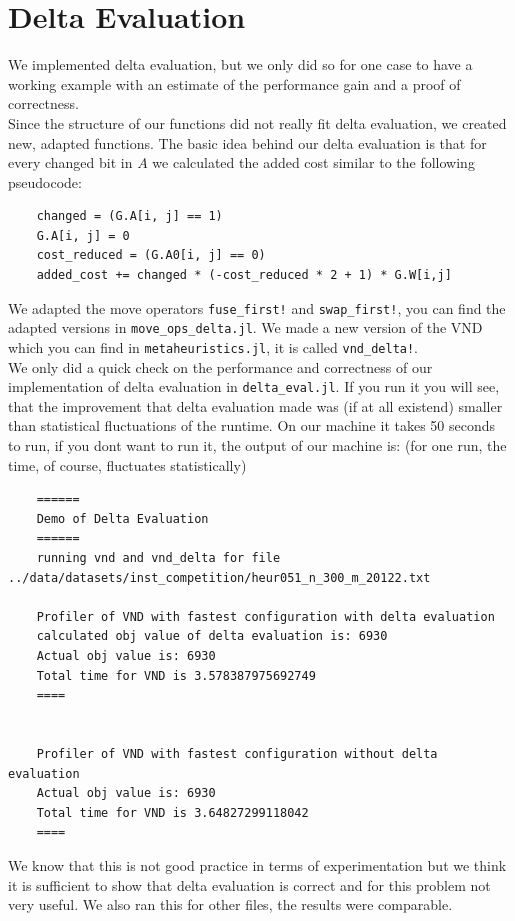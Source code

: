 \section{Delta Evaluation}

We implemented delta evaluation, but we only did so for one case to have a working example with an estimate of the performance gain and a proof of correctness.\\
Since the structure of our functions did not really fit delta evaluation, we created new, adapted functions. The basic idea behind our delta evaluation is that for every changed bit in $A$ we calculated the added cost similar to the following pseudocode:\\
\begin{verbatim}
    changed = (G.A[i, j] == 1)
    G.A[i, j] = 0
    cost_reduced = (G.A0[i, j] == 0)
    added_cost += changed * (-cost_reduced * 2 + 1) * G.W[i,j]
\end{verbatim}
We adapted the move operators \texttt{fuse\_first!} and \texttt{swap\_first!}, you can find the adapted versions in \texttt{move\_ops\_delta.jl}. We made a new version of the VND which you can find in \texttt{metaheuristics.jl}, it is called \texttt{vnd\_delta!}.\\
We only did a quick check on the performance and correctness of our implementation of delta evaluation in \texttt{delta\_eval.jl}. If you run it you will see, that the improvement that delta evaluation made was (if at all existend) smaller than statistical fluctuations of the runtime. On our machine it takes 50 seconds to run, if you dont want to run it, the output of our machine is: (for one run, the time, of course, fluctuates statistically)
\begin{verbatim}
    ======
    Demo of Delta Evaluation
    ======
    running vnd and vnd_delta for file ../data/datasets/inst_competition/heur051_n_300_m_20122.txt
    
    Profiler of VND with fastest configuration with delta evaluation
    calculated obj value of delta evaluation is: 6930
    Actual obj value is: 6930
    Total time for VND is 3.578387975692749
    ====
    
    
    Profiler of VND with fastest configuration without delta evaluation
    Actual obj value is: 6930
    Total time for VND is 3.64827299118042
    ====
\end{verbatim}
We know that this is not good practice in terms of experimentation but we think it is sufficient to show that delta evaluation is correct and for this problem not very useful. We also ran this for other files, the results were comparable.\\






